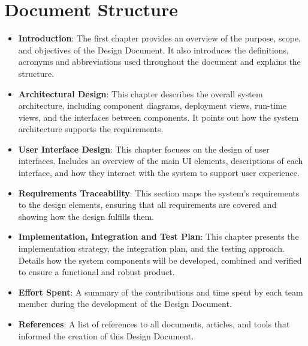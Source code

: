 \section{Document Structure}
\label{sec:document_structure}%
\begin{itemize}
    \item \textbf{Introduction}: The first chapter provides an overview of the purpose, scope, and objectives of the Design Document. It also introduces the definitions, acronyms and abbreviations used throughout the document and explains the structure.
    \item \textbf{Architectural Design}: This chapter describes the overall system architecture, including component diagrams, deployment views, run-time views, and the interfaces between components. It points out how the system architecture supports the requirements.
    \item \textbf{User Interface Design}: This chapter focuses on the design of user interfaces. Includes an overview of the main UI elements, descriptions of each interface, and how they interact with the system to support user experience.
    \item \textbf{Requirements Traceability}: This section maps the system's requirements to the design elements, ensuring that all requirements are covered and showing how the design fulfills them.
    \item \textbf{Implementation, Integration and Test Plan}: This chapter presents the implementation strategy, the integration plan, and the testing approach. Details how the system components will be developed, combined and verified to ensure a functional and robust product.
    \item \textbf{Effort Spent}: A summary of the contributions and time spent by each team member during the development of the Design Document.
    \item \textbf{References}: A list of references to all documents, articles, and tools that informed the creation of this Design Document.
\end{itemize}

